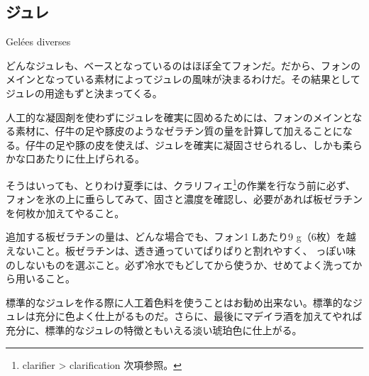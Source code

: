 \begin{main}

\hypertarget{gelees-diverses}{%
\section{ジュレ}\label{gelees-diverses}}

\begin{frsecenv}

Gelées diverses

\end{frsecenv}

 

どんなジュレも、ベースとなっているのはほぼ全てフォンだ。だから、フォンのメインとなっている素材によってジュレの風味が決まるわけだ。その結果としてジュレの用途もずと決まってくる。

人工的な凝固剤を使わずにジュレを確実に固めるためには、フォンのメインとなる素材に、仔牛の足や豚皮のようなゼラチン質の量を計算して加えることになる。仔牛の足や豚の皮を使えば、ジュレを確実に凝固させられるし、しかも柔らかな口あたりに仕上げられる。

そうはいっても、とりわけ夏季には、クラリフィエ\footnote{clarifier
  \textgreater{} clarification 次項参照。}の作業を行なう前に必ず、フォンを氷の上に垂らしてみて、固さと濃度を確認し、必要があれば板ゼラチンを何枚か加えてやること。

追加する板ゼラチンの量は、どんな場合でも、フォン1 Lあたり9
g（6枚）を越えないこと。板ゼラチンは、透き通っていてぱりぱりと割れやすく、
っぽい味のしないものを選ぶこと。必ず冷水でもどしてから使うか、せめてよく洗ってから用いること。

標準的なジュレを作る際に人工着色料を使うことはお勧め出来ない。標準的なジュレは充分に色よく仕上がるものだ。さらに、最後にマデイラ酒を加えてやれば充分に、標準的なジュレの特徴ともいえる淡い琥珀色に仕上がる。

\end{main}

